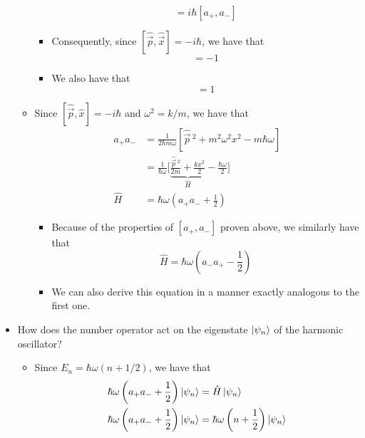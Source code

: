 \documentclass[../notes.tex]{subfiles}
\begin{document}
\begin{itemize}
\begin{itemize}
\begin{itemize}
\begin{equation*}
                = i\hbar[a_+,a_-]
            \end{equation*}
            \item Consequently, since $[\hat{\vec{p}},\hat{\vec{x}}]=-i\hbar$, we have that
            \begin{equation*}
                [a_+,a_-] = -1
            \end{equation*}
            \item We also have that
            \begin{equation*}
                [a_-,a_+] = 1
            \end{equation*}
        \end{itemize}
        \item Since $[\hat{\vec{p}},\hat{x}]=-i\hbar$ and $\omega^2=k/m$, we have that
        \begin{align*}
            a_+a_- &= \frac{1}{2\hbar m\omega}\left[ \hat{\vec{p}}{\,}^2+m^2\omega^2x^2-m\hbar\omega \right]\\
            &= \frac{1}{\hbar\omega}\Bigg[ \underbrace{\frac{\hat{\vec{p}}{\,}^2}{2m}+\frac{kx^2}{2}}_{\hat{H}}-\frac{\hbar\omega}{2} \Bigg]\\
            \hat{H} &= \hbar\omega\left( a_+a_-+\frac{1}{2} \right)
        \end{align*}
        \begin{itemize}
            \item Because of the properties of $[a_+,a_-]$ proven above, we similarly have that
            \begin{equation*}
                \hat{H} = \hbar\omega\left( a_-a_+-\frac{1}{2} \right)
            \end{equation*}
            \item We can also derive this equation in a manner exactly analogous to the first one.
        \end{itemize}
    \end{itemize}
    \item How does the number operator act on the eigenstate $\ket{\psi_n}$ of the harmonic oscillator?
    \begin{itemize}
        \item Since $E_n=\hbar\omega(n+1/2)$, we have that
        \begin{align*}
            \hbar\omega\left( a_+a_-+\frac{1}{2} \right)\ket{\psi_n} &= \hat{H}\ket{\psi_n}\\
            \hbar\omega\left( a_+a_-+\frac{1}{2} \right)\ket{\psi_n} &= \hbar\omega\left( n+\frac{1}{2} \right)\ket{\psi_n}\\

\end{align*}
\end{itemize}
\end{itemize}
\end{document}
